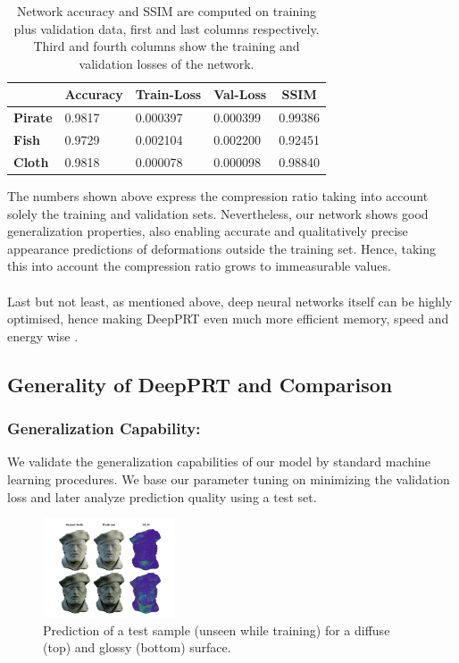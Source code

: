 \begin{table}[h]
\begin{tabular}{|l|l|l|l|l|}
\hline
\textbf{}            & \textbf{Accuracy} & \textbf{Train-Loss} & \textbf{Val-Loss} & \multicolumn{1}{c|}{\textbf{SSIM}} \\ \hline
\textbf{Pirate} & 0.9817            & 0.000397            & 0.000399                 & 0.99386                      \\ \hline
\textbf{Fish}        & 0.9729            & 0.002104            & 0.002200                      &  0.92451                   \\ \hline
\textbf{Cloth}       & 0.9818            & 0.000078            & 0.000098                 & 0.98840                      \\ \hline
\end{tabular}
\caption{Network accuracy and SSIM are computed on training plus validation data, first and last columns respectively. Third and fourth columns show the training and validation losses of the network.} 
\label{Table: NN_Accuracy}
\end{table}
The numbers shown above express the compression ratio taking into account solely the training and validation sets. Nevertheless, our network shows good generalization properties, also enabling accurate and qualitatively precise appearance predictions of deformations outside the training set. Hence, taking this into account the compression ratio grows to immeasurable values. 
\\
\\
Last but not least, as mentioned above, deep neural networks itself can be highly optimised, hence making DeepPRT even much more efficient memory, speed and energy wise \cite{Survey_NN_Compression}. 
\subsection*{Generality of DeepPRT and Comparison}
\subsubsection*{Generalization Capability:}
We validate the generalization capabilities of our model by standard machine learning procedures. We base our parameter tuning on minimizing the validation loss and later analyze prediction quality using a test set.
\begin{figure}[H]
  \centering
    \includegraphics[width=0.35\textwidth]{Figures/glossy_pirate.pdf}
     \caption{Prediction of a test sample (unseen while training) for a diffuse (top) and glossy (bottom) surface. }
     \label{Fig: glossy_pirate}
\end{figure}
